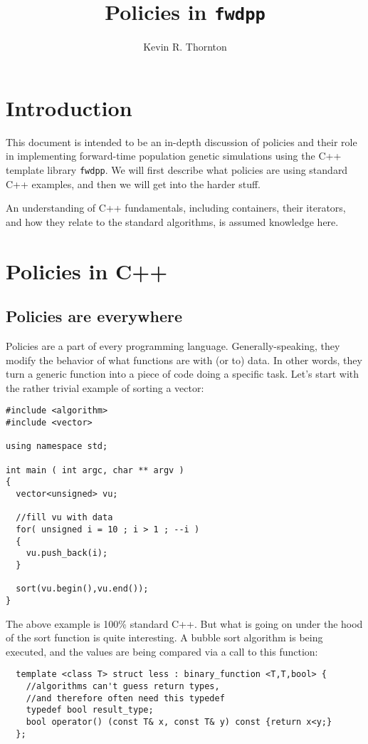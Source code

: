 \documentclass{article}
\author{Kevin R. Thornton}
\title{Policies in \texttt{fwdpp}}
\begin{document}
\maketitle
\tableofcontents

\newpage

\section{Introduction}
This document is intended to be an in-depth discussion of policies and their role in implementing forward-time population genetic simulations using the C++ template library \texttt{fwdpp}.  We will first describe what policies are using standard C++ examples, and then we will get into the harder stuff.

An understanding of C++ fundamentals, including containers, their iterators, and how they relate to the standard algorithms, is assumed knowledge here.

\section{Policies in C++}
\subsection{Policies are everywhere}
Policies are a part of every programming language.  Generally-speaking, they modify the behavior of what functions are with (or to) data.  In other words, they turn a generic function into a piece of code doing a specific task.  Let's start with the rather trivial example of sorting a vector:

\begin{lstlisting}
#include <algorithm>
#include <vector>

using namespace std;

int main ( int argc, char ** argv )
{
  vector<unsigned> vu;

  //fill vu with data
  for( unsigned i = 10 ; i > 1 ; --i )
  {
    vu.push_back(i);
  }

  sort(vu.begin(),vu.end());
}
\end{lstlisting}

The above example is 100\% standard C++.  But what is going on under the hood of the sort function is quite interesting.  A bubble sort algorithm is being executed, and the values are being compared via a call to this function:
\begin{lstlisting}
  template <class T> struct less : binary_function <T,T,bool> {
    //algorithms can't guess return types,
    //and therefore often need this typedef
    typedef bool result_type;
    bool operator() (const T& x, const T& y) const {return x<y;}
  };
\end{lstlisting}
\end{document}
